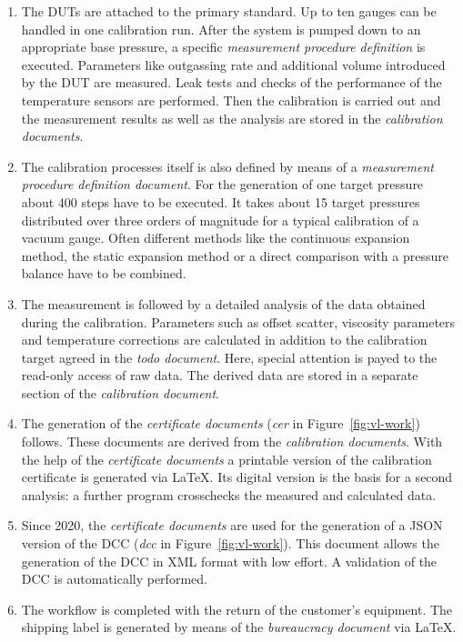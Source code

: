 \documentclass[3p,times,procedia]{elsarticle}
\begin{document}
\begin{enumerate}
\item The DUTs are attached to the primary standard. Up to ten gauges
  can be handled in one calibration run. After the system is pumped
  down to an appropriate base pressure, a specific \emph{measurement
    procedure definition} is executed. Parameters like outgassing
  rate and additional volume introduced by the DUT are measured. Leak
  tests and checks of the performance of the temperature sensors are performed.
  Then the calibration is carried out and the measurement results as well as
  the analysis are stored in the \emph{calibration documents}.

\item The calibration processes itself is also defined by means of a
  \emph{measurement procedure definition document}.  For the
  generation of one target pressure about 400 steps have to be
  executed. It takes about 15 target pressures distributed over three
  orders of magnitude for a typical calibration of a vacuum
  gauge. Often different methods like the continuous expansion method,
  the static expansion method or a direct comparison with a pressure
  balance have to be combined.  %
  
\item The measurement is followed by a detailed analysis of the data
  obtained during the calibration. Parameters such as offset scatter,
  viscosity parameters and temperature corrections are calculated in addition to the
  calibration target agreed in the \emph{todo document}.
  Here, special attention is payed to the read-only access of raw
  data. The derived data are stored in a separate section of the
  \emph{calibration document}.
  
\item The generation of the \emph{certificate documents} (\emph{cer}
  in Figure~\ref{fig:vl-work}) follows.  These documents are derived
  from the \emph{calibration documents}. With the help of the
  \emph{certificate documents} a printable version of the calibration
  certificate is generated via \LaTeX. Its digital version is the
  basis for a second analysis: a further program crosschecks the
  measured and calculated data.
  
\item Since 2020, the \emph{certificate documents} are used for the
  generation of a JSON version of the DCC (\emph{dcc} in
  Figure~\ref{fig:vl-work}). This document allows the generation of the DCC
  in XML format with low effort. A validation of the DCC is automatically performed.

\item\label{itm:last} The workflow is completed with the return of the customer's
  equipment. The shipping label is generated by means of the 
  \emph{bureaucracy document} via \LaTeX.
\end{enumerate}
\end{document}
